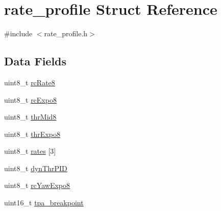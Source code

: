 \hypertarget{structrate__profile}{\section{rate\+\_\+profile Struct Reference}
\label{structrate__profile}
}


{\ttfamily \#include $<$rate\+\_\+profile.\+h$>$}

\subsection*{Data Fields}
\begin{DoxyCompactItemize}
\item 
uint8\+\_\+t \hyperlink{structrate__profile_a12b7ca2300ccfea7e100987fd8f74a20}{rc\+Rate8}
\item 
uint8\+\_\+t \hyperlink{structrate__profile_a485c67e030d38da50892f84da14a2329}{rc\+Expo8}
\item 
uint8\+\_\+t \hyperlink{structrate__profile_a1f8a754b6139ab81b9f641b968ddb1ce}{thr\+Mid8}
\item 
uint8\+\_\+t \hyperlink{structrate__profile_ac6c992e999d312c139f378b3c5be7c09}{thr\+Expo8}
\item 
uint8\+\_\+t \hyperlink{structrate__profile_afbd8b0cbd1902e9bfd4b182cbc9e994f}{rates} \mbox{[}3\mbox{]}
\item 
uint8\+\_\+t \hyperlink{structrate__profile_acd9ebf8ac7456a31398d785836f2e966}{dyn\+Thr\+P\+I\+D}
\item 
uint8\+\_\+t \hyperlink{structrate__profile_aaeb349a7087938c5247b0079a909938f}{rc\+Yaw\+Expo8}
\item 
uint16\+\_\+t \hyperlink{structrate__profile_af3f7ba8ebf4e5810704b0144917ed562}{tpa\+\_\+breakpoint}
\end{DoxyCompactItemize}


